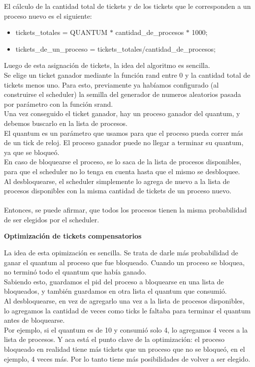 \indent El cálculo de la cantidad total de tickets y de los tickets que le corresponden a un proceso nuevo es el siguiente:\\
\begin{itemize}
 \item tickets\_totales = QUANTUM $*$ cantidad\_de\_procesos $*$ 1000;
 \item tickets\_de\_un\_proceso = tickets\_totales/cantidad\_de\_procesos;
\end{itemize}

\indent Luego de esta asignación de tickets, la idea del algoritmo es sencilla. \\
Se elige un ticket ganador mediante la función rand entre 0 y la cantidad total de tickets menos uno. Para esto, previamente ya habíamos configurado (al construirse el scheduler) la semilla del
generador de numeros aleatorios pasada por parámetro con la función srand.\\
Una vez conseguido el ticket ganador, hay un proceso ganador del quantum, y debemos buscarlo en la lista de procesos. \\
El quantum es un parámetro que usamos para que el proceso pueda correr más de un tick de reloj. 
El proceso ganador puede no llegar a terminar su quantum, ya que se bloqueó. \\
En caso de bloquearse el proceso, se lo saca de la lista de procesos disponibles, 
para que el scheduler no lo tenga en cuenta hasta que el mismo se desbloquee. \\
Al desbloquearse, el scheduler simplemente lo agrega de nuevo a la lista de procesos disponibles con la misma cantidad de
tickets de un proceso nuevo.\\\\

Entonces, se puede afirmar, que todos los procesos tienen la misma probabilidad de ser elegidos por el scheduler.\\

\begin{center}
 \textbf{Optimización de tickets compensatorios}
\end{center}

La idea de esta opimización es sencilla. Se trata de darle más probabilidad de ganar el quantum al proceso que fue bloqueado.
Cuando un proceso se bloquea, no terminó todo el quantum que había ganado.\\
Sabiendo esto, guardamos el pid del proceso a bloquearse en una lista de bloqueados, y también guardamos en otra lista 
el quantum que consumió.\\
Al desbloquearse, en vez de agregarlo una vez a la lista de procesos disponibles, lo agregamos la cantidad de veces como ticks 
le faltaba para terminar el quantum antes de bloquearse. \\
Por ejemplo, si el quantum es de 10 y consumió solo 4, lo agregamos 4 veces a la lista de procesos. 
Y aca está el punto clave de la optimización: el proceso bloqueado en realidad tiene más tickets que un proceso 
que no se bloqueó, en el ejemplo, 4 veces más. Por lo tanto tiene más posibilidades de volver a ser elegido.\\